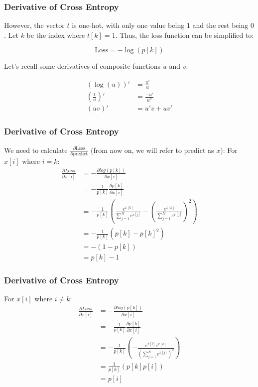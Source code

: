 \documentclass{beamer}
\begin{document}
    \begin{frame}
    	\frametitle{Derivative of Cross Entropy}
    	However, the vector \( t \) is one-hot, with only one value being \( 1 \) and the rest being \( 0 \). Let \( k \) be the index where \( t[k] = 1 \). Thus, the loss function can be simplified to:
    	
    	\[
    	\text{Loss} = -\log(p[k])
    	\]
    	
    	Let’s recall some derivatives of composite functions \( u \) and \( v \):
    	
 
    	\begin{align*}
    		(\log(u))' &= \frac{u'}{u} \\
    		\left(\frac{1}{u}\right)' &= \frac{-u'}{u^2} \\
    		(uv)' &= u'v + uv'
    	\end{align*}
    \end{frame}
    
    \begin{frame}
    	\frametitle{Derivative of Cross Entropy}
    	We need to calculate \( \frac{\partial \text{Loss}}{\partial \text{predict}} \) (from now on, we will refer to \( \text{predict} \) as \( x \)):
    	For $x[i]$ where $i=k$:
    	\begin{align*}
    		\frac{\partial Loss}{\partial x[i]} &= -\frac{\partial log(p[k])}{\partial x[i]}\\
    		&= -\frac{1}{p[k]} \frac{\partial p[k]}{\partial x[i]}\\
    		&= -\frac{1}{p[k]} (\frac{e^{x[k]}}{\sum_{j=1}^N e^{x[j]}} - (\frac{e^{x[k]}}{\sum_{j=1}^N e^{x[j]}})^2)\\
    		&= -\frac{1}{p[k]} (p[k] - p[k]^2)\\
    		&= -(1 - p[k])\\
    		&= p[k] - 1
    	\end{align*}
    \end{frame}
    
    \begin{frame}
    	\frametitle{Derivative of Cross Entropy}
    	For $x[i]$ where $i\neq k$:
    	\begin{align*}
    		\frac{\partial Loss}{\partial x[i]} &= -\frac{\partial log(p[k])}{\partial x[i]}\\
    		&= -\frac{1}{p[k]} \frac{\partial p[k]}{\partial x[i]}\\
    		&= -\frac{1}{p[k]} (-\frac{e^{x[i]}e^{x[k]}}{(\sum_{j=1}^N e^{x[j]})^2})\\
    		&= \frac{1}{p[k]}(p[k]p[i])\\
    		&= p[i]
    	\end{align*}
    \end{frame}
    
\end{document}
